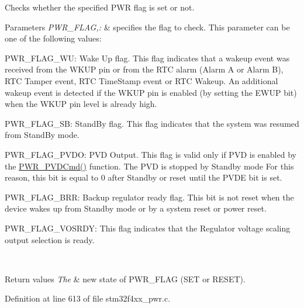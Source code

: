 Checks whether the specified P\-W\-R flag is set or not. 


\begin{DoxyParams}{Parameters}
{\em P\-W\-R\-\_\-\-F\-L\-A\-G,\-:} & specifies the flag to check. This parameter can be one of the following values\-: \begin{DoxyItemize}
\item P\-W\-R\-\_\-\-F\-L\-A\-G\-\_\-\-W\-U\-: Wake Up flag. This flag indicates that a wakeup event was received from the W\-K\-U\-P pin or from the R\-T\-C alarm (Alarm A or Alarm B), R\-T\-C Tamper event, R\-T\-C Time\-Stamp event or R\-T\-C Wakeup. An additional wakeup event is detected if the W\-K\-U\-P pin is enabled (by setting the E\-W\-U\-P bit) when the W\-K\-U\-P pin level is already high. \item P\-W\-R\-\_\-\-F\-L\-A\-G\-\_\-\-S\-B\-: Stand\-By flag. This flag indicates that the system was resumed from Stand\-By mode. \item P\-W\-R\-\_\-\-F\-L\-A\-G\-\_\-\-P\-V\-D\-O\-: P\-V\-D Output. This flag is valid only if P\-V\-D is enabled by the \hyperlink{group___p_w_r___private___functions_ga42cad476b816e0a33594a933b3ed1acd}{P\-W\-R\-\_\-\-P\-V\-D\-Cmd()} function. The P\-V\-D is stopped by Standby mode For this reason, this bit is equal to 0 after Standby or reset until the P\-V\-D\-E bit is set. \item P\-W\-R\-\_\-\-F\-L\-A\-G\-\_\-\-B\-R\-R\-: Backup regulator ready flag. This bit is not reset when the device wakes up from Standby mode or by a system reset or power reset. \item P\-W\-R\-\_\-\-F\-L\-A\-G\-\_\-\-V\-O\-S\-R\-D\-Y\-: This flag indicates that the Regulator voltage scaling output selection is ready. \end{DoxyItemize}
\\
\hline
\end{DoxyParams}

\begin{DoxyRetVals}{Return values}
{\em The} & new state of P\-W\-R\-\_\-\-F\-L\-A\-G (S\-E\-T or R\-E\-S\-E\-T). \\
\hline
\end{DoxyRetVals}


Definition at line 613 of file stm32f4xx\-\_\-pwr.\-c.

